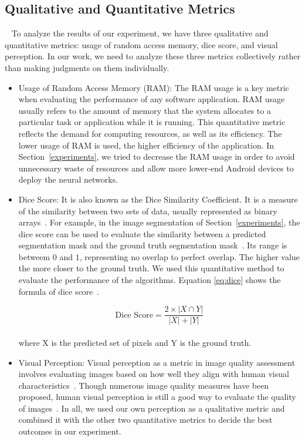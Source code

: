 \documentclass[runningheads]{llncs}
\begin{document}
\subsection{Qualitative and Quantitative Metrics}~\label{metrics}
To analyze the results of our experiment, we have three qualitative and quantitative metrics: usage of random access memory, dice score, and visual perception. In our work, we need to analyze these three metrics collectively rather than making judgments on them individually.
\begin{itemize}
	\item Usage of Random Access Memory (RAM): The RAM usage is a key metric when evaluating the performance of any software application. RAM usage usually refers to the amount of memory that the system allocates to a particular task or application while it is running. This quantitative metric reflects the demand for computing resources, as well as its efficiency. The lower usage of RAM is used, the higher efficiency of the application. In Section~\ref{experiments}, we tried to decrease the RAM usage in order to avoid unnecessary waste of resources and allow more lower-end Android devices to deploy the neural networks.
	\item Dice Score: It is also known as the Dice Similarity Coefficient. It is a measure of the similarity between two sets of data, usually represented as binary arrays~\cite{dicescore2023}. For example, in the image segmentation of Section~\ref{experiments}, the dice score can be used to evaluate the similarity between a predicted segmentation mask and the ground truth segmentation mask~\cite{dicescore2023}. Its range is betweem $0$ and $1$, representing no overlap to perfect overlap. The higher value the more closer to the ground truth. We used this quantitative method to evaluate the performance of the algorithms. Equation \eqref{eq:dice} shows the formula of dice score~\cite{yerram2020dice}.
	
	\begin{equation}\label{eq:dice}
		\text{Dice Score} = \frac{2 \times |X \cap Y|}{|X| + |Y|}
	\end{equation}
\\where X is the predicted set of pixels and Y is the ground truth.\\
		\item Visual Perception: Visual perception as a metric in image quality assessment involves evaluating images based on how well they align with human visual characteristics~\cite{fu2016visual}. Though numerous image quality measures have been proposed, human visual perception is still a good way to evaluate the quality of images~\cite{wajid2014visual}. In all, we used our own perception as a qualitative metric and combined it with the other two quantitative metrics to decide the best outcomes in our experiment. 
\end{itemize}	
\end{document}

